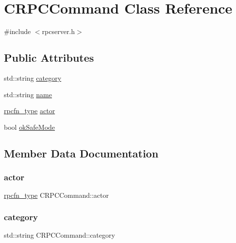 \hypertarget{class_c_r_p_c_command}{}\section{C\+R\+P\+C\+Command Class Reference}
\label{class_c_r_p_c_command}


{\ttfamily \#include $<$rpcserver.\+h$>$}

\subsection*{Public Attributes}
\begin{DoxyCompactItemize}
\item 
std\+::string \mbox{\hyperlink{class_c_r_p_c_command_a27dd2710a5f94011f891f6a2efcec53a}{category}}
\item 
std\+::string \mbox{\hyperlink{class_c_r_p_c_command_a8da584c0d2d98be22ebff74d3cf2221c}{name}}
\item 
\mbox{\hyperlink{rpcserver_8h_abd1b2d0c1b4a4b6483cbddaea9ea7b0a}{rpcfn\+\_\+type}} \mbox{\hyperlink{class_c_r_p_c_command_a197a7eba565b4d9673537655fcbc1344}{actor}}
\item 
bool \mbox{\hyperlink{class_c_r_p_c_command_a7f0b10e619917a3019f36ba5fa538adb}{ok\+Safe\+Mode}}
\end{DoxyCompactItemize}


\subsection{Member Data Documentation}
\mbox{\label{class_c_r_p_c_command_a197a7eba565b4d9673537655fcbc1344}} 
\subsubsection{\texorpdfstring{actor}{actor}}
{\footnotesize\ttfamily \mbox{\hyperlink{rpcserver_8h_abd1b2d0c1b4a4b6483cbddaea9ea7b0a}{rpcfn\+\_\+type}} C\+R\+P\+C\+Command\+::actor}

\mbox{\label{class_c_r_p_c_command_a27dd2710a5f94011f891f6a2efcec53a}} 
\subsubsection{\texorpdfstring{category}{category}}
{\footnotesize\ttfamily std\+::string C\+R\+P\+C\+Command\+::category}

